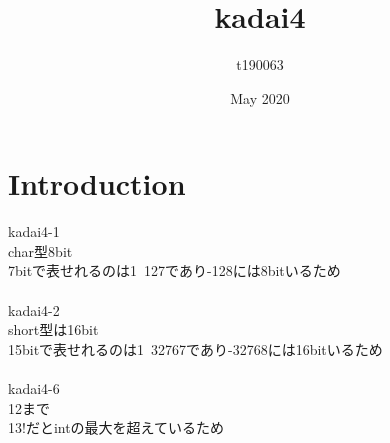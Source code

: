 \documentclass{article}
\title{kadai4}
\author{t190063 }
\date{May 2020}
\begin{document}
\maketitle

\section{Introduction}
kadai4-1\\
char型8bit\\
7bitで表せれるのは1~127であり-128には8bitいるため\\\\
kadai4-2\\
short型は16bit\\
15bitで表せれるのは1~32767であり-32768には16bitいるため\\\\
kadai4-6\\
12まで\\
13!だとintの最大を超えているため
\end{document}
